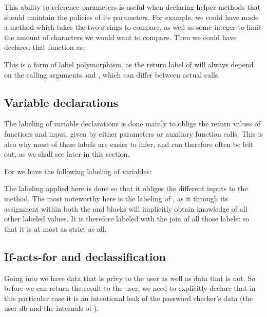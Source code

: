 This ability to reference parameters is useful when declaring helper methods that should maintain the policies of its parameters.
For example, we could have made a  method which takes the two strings to compare, as well as some integer to limit the amount of characters we would want to compare.
Then we could have declared that function as: \\
\begin{minipage}{\linewidth}
  \centering
\end{minipage}

This is a form of label polymorphism, as the return label of  will always depend on the calling arguments  and , which can differ between actual calls.

\subsection{Variable declarations}
The labeling of variable declarations is done mainly to oblige the return values of functions and input, given by either parameters or auxiliary function calls.
This is also why most of these labels are easier to infer, and can therefore often be left out, as we shall see later in this section.

For  we have the following labeling of variables:\\
\begin{minipage}{\linewidth}

\end{minipage}

The labeling applied here is done so that it obliges the different inputs to the method.
The most noteworthy here is the labeling of , as it through its assignment within both the  and  blocks will implicitly obtain knowledge of all other labeled values.
It is therefore labeled with the join of all those labels:  so that it is at most as strict as all.

\subsection{If-acts-for and declassification}\label{ctif:informal:ifactsfor_declassify}
Going into  we have data that is privy to the user as well as data that is not.
So before we can return the result to the user, we need to explicitly declare that in this particular case it is an intentional leak of the password checker's data (the user db and the internals of ).

